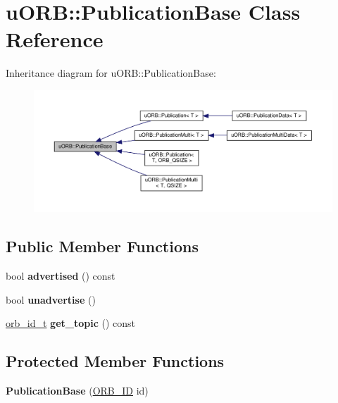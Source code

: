 \hypertarget{classuORB_1_1PublicationBase}{}\section{u\+O\+RB\+:\+:Publication\+Base Class Reference}
\label{classuORB_1_1PublicationBase}


Inheritance diagram for u\+O\+RB\+:\+:Publication\+Base\+:\nopagebreak
\begin{figure}[H]
\begin{center}
\leavevmode
\includegraphics[width=350pt]{d0/d95/classuORB_1_1PublicationBase__inherit__graph}
\end{center}
\end{figure}
\subsection*{Public Member Functions}
\begin{DoxyCompactItemize}
\item 
\mbox{\label{classuORB_1_1PublicationBase_a7b21359765206fde43a3700c3e8179e4}} 
bool {\bfseries advertised} () const
\item 
\mbox{\label{classuORB_1_1PublicationBase_a8d5bafb4b89d6894176b0a57d2f69310}} 
bool {\bfseries unadvertise} ()
\item 
\mbox{\label{classuORB_1_1PublicationBase_a106832b4ccbf1efe88acd7d32ab0ea7e}} 
\hyperlink{structorb__metadata}{orb\+\_\+id\+\_\+t} {\bfseries get\+\_\+topic} () const
\end{DoxyCompactItemize}
\subsection*{Protected Member Functions}
\begin{DoxyCompactItemize}
\item 
\mbox{\label{classuORB_1_1PublicationBase_a8d0ea2cadf61656b9d6168377d5dd7d6}} 
{\bfseries Publication\+Base} (\hyperlink{uORB_8h_a96af5434ec1acdf24287bd7851b0413f}{O\+R\+B\+\_\+\+ID} id)
\end{DoxyCompactItemize}
